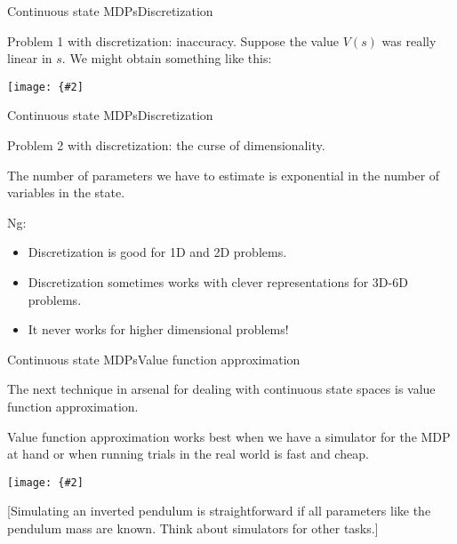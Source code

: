 \documentclass{beamer}
\newcommand{\myfig}[3]{\centerline{\texttt{[image: \{\#2]}}}
    \centerline{\scriptsize #3}}
\begin{document}
\begin{frame}{Continuous state MDPs}{Discretization}

  Problem 1 with discretization: \alert{inaccuracy}. Suppose the value
  $V(s)$ was really linear in $s$. We might obtain something like this:

  \myfig{2.5in}{ng-approx}{Ng (2017), CS 229 lecture notes, set 12}

\end{frame}


\begin{frame}{Continuous state MDPs}{Discretization}

  Problem 2 with discretization: \alert{the curse of dimensionality}.

  \medskip

  The number of parameters we have to estimate is exponential in the number
  of variables in the state.

  \medskip

  Ng:
  \begin{itemize}
  \item Discretization is good for 1D and 2D problems.
  \item Discretization sometimes works with clever representations for 3D-6D problems.
  \item It never works for higher dimensional problems!
  \end{itemize}
  
\end{frame}


\begin{frame}{Continuous state MDPs}{Value function approximation}

  The next technique in arsenal for dealing with continuous state
  spaces is \alert{value function approximation}.

  \medskip

  Value function approximation works best when we have a
  \alert{simulator} for the MDP at hand or when running trials in the
  real world is fast and cheap.

  \medskip

  \myfig{2in}{ng-sim}{Ng (2017), CS 229 lecture notes, set 12}

  \medskip

  [Simulating an inverted pendulum is straightforward if all
    parameters like the pendulum mass are known. Think about
    simulators for other tasks.]

\end{frame}
\end{document}
